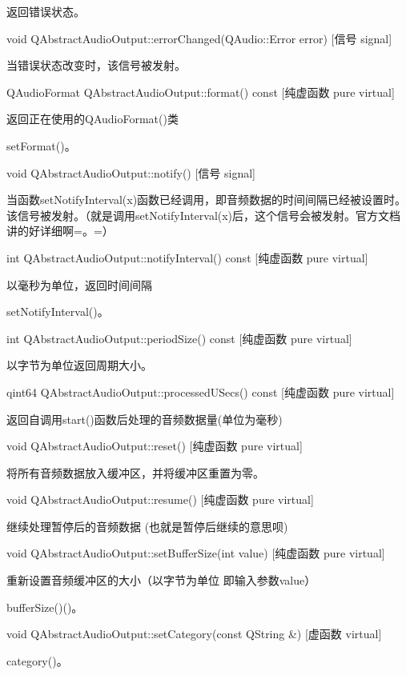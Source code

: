 返回错误状态。

void QAbstractAudioOutput::errorChanged(QAudio::Error error) [信号 signal] 

当错误状态改变时，该信号被发射。

QAudioFormat QAbstractAudioOutput::format() const [纯虚函数 pure virtual]

返回正在使用的QAudioFormat()类 

\begin{notice}[另请参阅]
setFormat()。
\end{notice}

void QAbstractAudioOutput::notify() [信号 signal] 

当函数setNotifyInterval(x)函数已经调用，即音频数据的时间间隔已经被设置时。该信号被发射。（就是调用setNotifyInterval(x)后，这个信号会被发射。官方文档讲的好详细啊=。=）

int QAbstractAudioOutput::notifyInterval() const [纯虚函数 pure virtual]

以毫秒为单位，返回时间间隔 

\begin{notice}[另请参阅]
setNotifyInterval()。
\end{notice}

int QAbstractAudioOutput::periodSize() const [纯虚函数 pure virtual] 

以字节为单位返回周期大小。

qint64 QAbstractAudioOutput::processedUSecs() const [纯虚函数 pure
virtual] 

返回自调用start()函数后处理的音频数据量(单位为毫秒)

void QAbstractAudioOutput::reset() [纯虚函数 pure virtual] 

将所有音频数据放入缓冲区，并将缓冲区重置为零。

void QAbstractAudioOutput::resume() [纯虚函数 pure virtual] 

继续处理暂停后的音频数据 (也就是暂停后继续的意思呗)

void QAbstractAudioOutput::setBufferSize(int value) [纯虚函数 pure virtual]

重新设置音频缓冲区的大小（以字节为单位 即输入参数value） 

\begin{notice}[另请参阅]
bufferSize()()。
\end{notice}

void QAbstractAudioOutput::setCategory(const QString \&) [虚函数 virtual] 

\begin{notice}[另请参阅]
category()。
\end{notice}

